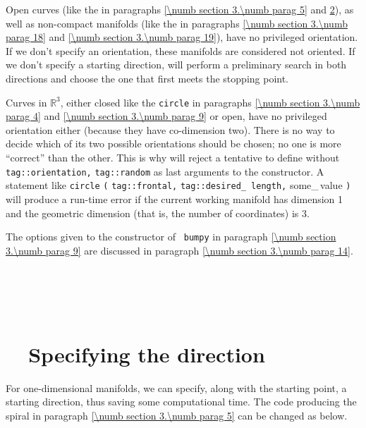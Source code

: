 Open curves (like the {\small\tt{}} in paragraphs \ref{\numb section 3.\numb parag 5} and
\ref{\numb section 3.\numb parag 12}), as well as non-compact manifolds
(like the {\small\tt{}} in paragraphs \ref{\numb section 3.\numb parag 18} and
\ref{\numb section 3.\numb parag 19}), have no privileged orientation.
If we don't specify an orientation, these manifolds are considered not oriented.
If we don't specify a starting direction, {\maniFEM} will perform a preliminary search
in both directions and choose the one that first meets the stopping point.

Curves in $ \mathbb{R}^3 $, either closed like the {\small\tt circle} in paragraphs
\ref{\numb section 3.\numb parag 4} and \ref{\numb section 3.\numb parag 9} or open,
have no privileged orientation either (because they have co-dimension two).
There is no way to decide which of its two possible orientations
should be chosen; no one is more ``correct'' than the other.
This is why {\maniFEM} will reject a tentative to define {\small\tt{}} without
{\small\tt\textcolor{tag}{tag}::orientation,} {\small\tt\textcolor{tag}{tag}::random}
as last arguments to the {\small\tt{}} constructor.
A statement like {\small\tt{}} {\small\tt circle} {\small\tt (}
{\small\tt\textcolor{tag}{tag}::frontal,} {\small\tt\textcolor{tag}{tag}::desired\_\,length,}
some\_\,value {\small\tt)}
will produce a run-time error if the current working manifold has dimension 1 and
the geometric dimension (that is, the number of coordinates) is 3.

The options given to the constructor of {\small\tt{} bumpy} in paragraph
\ref{\numb section 3.\numb parag 9} are discussed in paragraph
\ref{\numb section 3.\numb parag 14}.


\section{~~\cinzasec{[empty]}}\label{\numb section 3.\numb parag 11}


\section{~~Specifying the direction}\label{\numb section 3.\numb parag 12}

For one-dimensional manifolds, we can specify, along with the starting point,
a starting direction, thus saving some computational time.
The code producing the spiral in paragraph \ref{\numb section 3.\numb parag 5}
can be changed as below.

